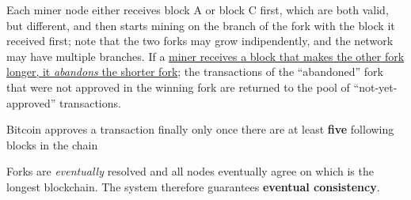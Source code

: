 Each miner node either receives block A or block C first, which are both valid, but different,
and then starts mining on the branch of the fork with the block it received first;
note that the two forks may grow indipendently, and the network may have multiple branches.
If a \ul{miner receives a block that makes the other fork longer, it \textit{abandons} the
shorter fork};
the transactions of the ``abandoned'' fork that were not approved in the winning fork are returned to the pool of ``not-yet-approved'' transactions.
\begin{definition}
   Bitcoin approves a transaction finally only once there are at least \textbf{five} following blocks in the chain 
\end{definition}


\begin{definition}
   Forks are \textit{eventually} resolved and all nodes eventually agree on which is the longest
   blockchain. The system therefore guarantees \textbf{eventual consistency}.
\end{definition}